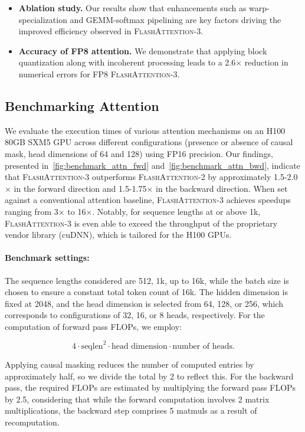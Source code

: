 \begin{enumerate}
\begin{algorithm}[H]
\begin{algorithmic}[1]
\begin{itemize}
\item \textbf{Ablation study.} Our results show that enhancements such as warp-specialization and GEMM-softmax pipelining are key factors driving the improved efficiency observed in \textsc{FlashAttention-3}.

\item \textbf{Accuracy of FP8 attention.} We demonstrate that applying block quantization along with incoherent processing leads to a 2.6$\times$ reduction in numerical errors for FP8 \textsc{FlashAttention-3}.
\end{itemize}

\subsection{Benchmarking Attention}
\label{subsec:benchmark_attn}

We evaluate the execution times of various attention mechanisms on an H100 80GB SXM5 GPU across different configurations (presence or absence of causal mask, head dimensions of 64 and 128) using FP16 precision. Our findings, presented in~\cref{fig:benchmark_attn_fwd} and~\cref{fig:benchmark_attn_bwd}, indicate that \textsc{FlashAttention-3} outperforms \textsc{FlashAttention-2} by approximately 1.5-2.0$\times$ in the forward direction and 1.5-1.75$\times$ in the backward direction. When set against a conventional attention baseline, \textsc{FlashAttention-3} achieves speedups ranging from 3$\times$ to 16$\times$. Notably, for sequence lengths at or above 1k, \textsc{FlashAttention-3} is even able to exceed the throughput of the proprietary vendor library (cuDNN), which is tailored for the H100 GPUs.

\paragraph{Benchmark settings:} The sequence lengths considered are 512, 1k, up to 16k, while the batch size is chosen to ensure a constant total token count of 16k. The hidden dimension is fixed at 2048, and the head dimension is selected from 64, 128, or 256, which corresponds to configurations of 32, 16, or 8 heads, respectively. For the computation of forward pass FLOPs, we employ:

\begin{equation*}
  4 \cdot \text{seqlen}^2 \cdot \text{head dimension} \cdot \text{number of heads}.
\end{equation*}

Applying causal masking reduces the number of computed entries by approximately half, so we divide the total by 2 to reflect this. For the backward pass, the required FLOPs are estimated by multiplying the forward pass FLOPs by 2.5, considering that while the forward computation involves 2 matrix multiplications, the backward step comprises 5 matmuls as a result of recomputation.


\end{algorithmic}
\end{algorithm}
\end{enumerate}
